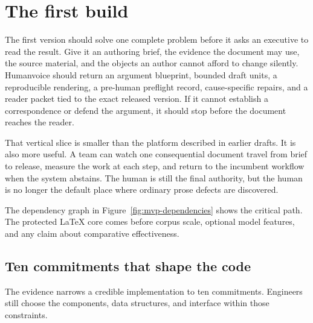 \chapter{The first build}
\label{ch:proposal}
\label{sec:design}

The first version should solve one complete problem before it asks an executive
to read the result. Give it an authoring brief, the evidence the document may
use, the source material, and the objects an author cannot afford to change
silently. Humanvoice should return an argument blueprint, bounded draft units,
a reproducible rendering, a pre-human preflight record, cause-specific repairs,
and a reader packet tied to the exact released version. If it cannot establish a
correspondence or defend the argument, it should stop before the document
reaches the reader.

That vertical slice is smaller than the platform described in earlier drafts.
It is also more useful. A team can watch one consequential document travel from
brief to release, measure the work at each step, and return to the incumbent
workflow when the system abstains. The human is still the final authority, but
the human is no longer the default place where ordinary prose defects are
discovered.

The dependency graph in Figure~\ref{fig:mvp-dependencies} shows the critical
path. The protected LaTeX core comes before corpus scale, optional model
features, and any claim about comparative effectiveness.

\hvFigureMVPDependencies

\section{Ten commitments that shape the code}

The evidence narrows a credible implementation to ten commitments. Engineers
still choose the components, data structures, and interface within those
constraints.

